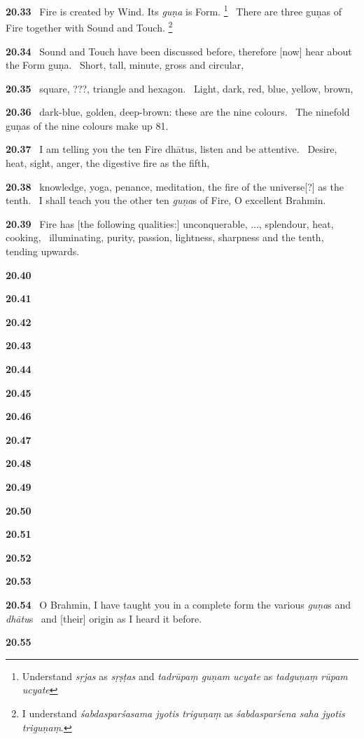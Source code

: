 \documentclass{article}
\newcommand{\skt}[1]{\textit{#1}}
\begin{document}
\textbf{20.33}%
\ Fire is created by Wind. Its \skt{guṇa} is Form.%
\footnote{Understand \skt{sṛjas} as \skt{sṛṣṭas} and \skt{tadrūpaṃ guṇam ucyate} as \skt{tadguṇaṃ rūpam ucyate} }%
\ There are three guṇas of Fire together with Sound and Touch.%
\footnote{I understand \skt{śabdasparśasama jyotis triguṇaṃ} as \skt{śabdasparśena saha jyotis triguṇaṃ}. }%


\textbf{20.34}%
\ Sound and Touch have been discussed before, therefore [now] hear about the Form guṇa.%
\ Short, tall, minute, gross and circular,%


\textbf{20.35}%
\ square, ???, triangle and hexagon.%
\ Light, dark, red, blue, yellow, brown,%


\textbf{20.36}%
\ dark-blue, golden, deep-brown: these are the nine colours.%
\ The ninefold guṇas of the nine colours make up 81.%


\textbf{20.37}%
\ I am telling you the ten Fire dhātus, listen and be attentive.%
\ Desire, heat, sight, anger, the digestive fire as the fifth,%


\textbf{20.38}%
\ knowledge, yoga, penance, meditation, the fire of the universe[?] as the tenth.%
\ I shall teach you the other ten \skt{guṇa}s of Fire, O excellent Brahmin.%


\textbf{20.39}%
\ Fire has [the following qualities:] unconquerable, ..., splendour, heat, cooking,%
\                         illuminating, purity, passion, lightness, sharpness and the tenth, tending upwards.%


\textbf{20.40}%


\textbf{20.41}%


\textbf{20.42}%


\textbf{20.43}%


\textbf{20.44}%


\textbf{20.45}%


\textbf{20.46}%


\textbf{20.47}%


\textbf{20.48}%


\textbf{20.49}%


\textbf{20.50}%


\textbf{20.51}%


\textbf{20.52}%


\textbf{20.53}%


\textbf{20.54}%
\ O Brahmin, I have taught you in a complete form the various \skt{guṇa}s and \skt{dhātu}s%
\                         and [their] origin as I heard it before.%


\textbf{20.55}%
\end{document}
